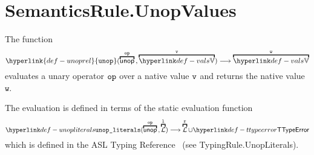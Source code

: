 \documentclass{book}
\newcommand\unoprel[0]{\hyperlink{def-unoprel}{\texttt{unop}}}
\newcommand\vl[0]{\texttt{l}}
\newcommand\vw[0]{\texttt{w}}
\begin{document}
\section{SemanticsRule.UnopValues \label{sec:SemanticsRule.UnopValues}}
\hypertarget{def-unoprel}{}
The function
\[
  \unoprel(\overname{\unop}{\op} \aslsep \overname{\vals}{\vv}) \aslto \overname{\vals}{\vw}
\]
evaluates a unary operator $\texttt{op}$ over a native value $\texttt{v}$ and returns the native value $\vw$.

The evaluation is defined in terms of the static evaluation function
\hypertarget{def-unopliterals}{}
\[
  \unopliterals(\overname{\unop}{\op} \aslsep \overname{\literals}{\vl}) \aslto
  \overname{\literals}{\vr} \cup \TTypeError
\]
which is defined in the ASL Typing Reference~\cite{ASLTypingReference} (see TypingRule.UnopLiterals).
\end{document}
